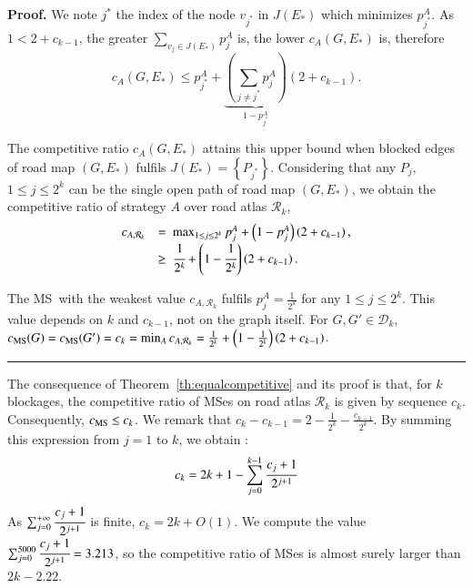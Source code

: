 \documentclass[preprint]{elsarticle}
\newenvironment{proof}[1][Proof]{\textbf{#1.} }{\ \rule{0.5em}{0.5em}}
\newcommand{\set}[1]{\left\{ #1 \right\}}
\newcommand{\mcalr}{\mathcal{R}}
\newcommand{\mcald}{\mathcal{D}}
\newcommand{\mts}{MS}
\newcommand{\cms}{c_{\mbox{\scriptsize{MS}}}}
\begin{document}
\begin{proof}
We note $j^*$ the index of the node $v_{j^*}$ in $J\left(E_*\right)$ which minimizes $p_{j^*}^A$. As $1 < 2 + c_{k-1}$, the greater $\sum_{v_j\in J(E_*)} p_j^A$ is, the lower $c_A(G, E_*)$ is, therefore
\[
c_A(G, E_*) \le p_{j^*}^A + \underbrace{\left(\sum_{j\neq j^*}p_j^A\right) }_{1-p_{j^*}^A}(2+c_{k-1}).
\] 

The competitive ratio $c_A(G, E_*)$ attains this upper bound when blocked edges of road map $\left(G,E_*\right)$ fulfils $J\left(E_*\right) = \set{P_{j^*}}$. Considering that any $P_j$, $1 \le j \le 2^k$ can be the single open path of road map $\left(G,E_*\right)$, we obtain the competitive ratio of strategy $A$ over road atlas $\mcalr_k$,
\[
\begin{array}{rl}
c_{A,\mcalr_k} & =  ~\max_{1 \le j \le 2^k} p_j^{A} + \left(1-p_j^{A}\right)\left(2+c_{k-1}\right),\\
& \geq ~\cfrac{1}{2^k} + \left(1-\cfrac{1}{2^k}\right)\left(2+c_{k-1}\right).
\end{array}
\]

The \mts ~with the weakest value $c_{A,\mcalr_k}$ fulfils $p_j^A = \frac{1}{2^k}$ for any $1 \le j \le 2^k$. This value depends on $k$ and $c_{k-1}$, not on the graph itself. For $G,G' \in \mcald_k$, $\cms(G) = \cms(G') = c_k = \min_{A} c_{A,\mcalr_k} = \frac{1}{2^k} + \left(1-\frac{1}{2^k}\right)\left(2+c_{k-1}\right)$.
\end{proof}

The consequence of Theorem~\ref{th:equalcompetitive} and its proof is that, for $k$ blockages, the competitive ratio of \mts es on road atlas $\mcalr_k$ is given by sequence $c_k$. Consequently, $\cms \le c_k$.
We remark that $c_k - c_{k-1} = 2 - \frac{1}{2^{k}} - \frac{c_{k-1}}{2^{k}}$.
By summing this expression from $j = 1$ to $k$, we obtain :
\[
c_k = 2k+1-\sum_{j=0}^{k-1}\cfrac{c_j+1}{2^{j+1}}
\]
As $\sum_{j=0}^{+\infty}\cfrac{c_j+1}{2^{j+1}}$ is finite, $c_k = 2k + O(1)$. We compute the value $\sum_{j=0}^{5000}\cfrac{c_j+1}{2^{j+1}} = 3.213$, so the competitive ratio of \mts es is almost surely larger than $2k-2.22$.
\end{document}

